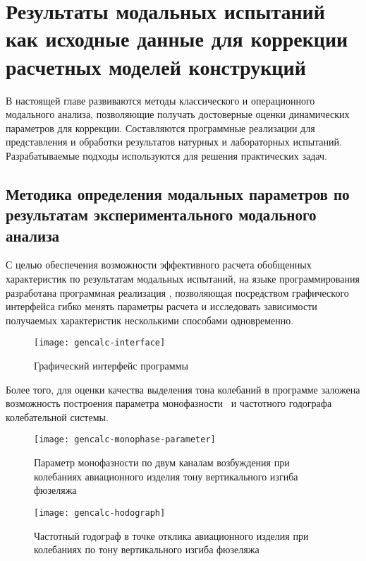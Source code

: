\chapter{Результаты модальных испытаний как исходные данные для коррекции расчетных моделей конструкций}

В настоящей главе развиваются методы классического и операционного модального анализа, позволяющие получать достоверные оценки динамических параметров для коррекции. Составляются программные реализации для представления и обработки результатов натурных и лабораторных испытаний. Разрабатываемые подходы используются для решения практических задач. 

\section{Методика определения модальных параметров по результатам экспериментального модального анализа}

С целью обеспечения возможности эффективного расчета обобщенных характеристик по результатам модальных испытаний, на языке программирования  разработана программная реализация , позволяющая посредством графического интерфейса  гибко менять параметры расчета и исследовать зависимости получаемых характеристик несколькими способами одновременно. 

\begin{figure}[H]
	\centerfloat
	\texttt{[image: gencalc-interface]}
	\caption{Графический интерфейс программы~} \label{fig:gencalc-interface}
\end{figure}

Более того, для оценки качества выделения тона колебаний в программе заложена возможность построения параметра монофазности~ и частотного годографа~ колебательной системы.

\begin{figure}[!htb]
	\centerfloat
	\texttt{[image: gencalc-monophase-parameter]}
	\caption{Параметр монофазности по двум каналам возбуждения при колебаниях авиационного изделия тону вертикального изгиба фюзеляжа} \label{fig:gencalc-monophase-parameter}
\end{figure}

\begin{figure}[!htb]
	\centerfloat
	\texttt{[image: gencalc-hodograph]}
	\caption{Частотный годограф в точке отклика авиационного изделия при колебаниях по тону вертикального изгиба фюзеляжа} \label{fig:gencalc-hodograph}
\end{figure}

